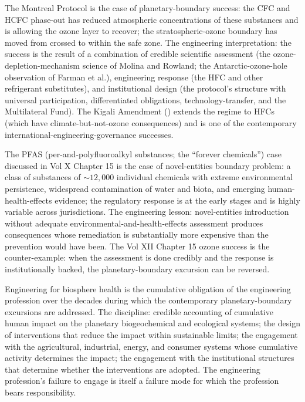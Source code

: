 The Montreal Protocol \cite{law:montreal-protocol-1987} is the case of planetary-boundary success: the CFC and HCFC phase-out has reduced atmospheric concentrations of these substances and is allowing the ozone layer to recover; the stratospheric-ozone boundary has moved from crossed to within the safe zone. The engineering interpretation: the success is the result of a combination of credible scientific assessment (the ozone-depletion-mechanism science of Molina and Rowland; the Antarctic-ozone-hole observation of Farman et al.), engineering response (the HFC and other refrigerant substitutes), and institutional design (the protocol's structure with universal participation, differentiated obligations, technology-transfer, and the Multilateral Fund). The Kigali Amendment (\cite{law:kigali-amendment-2016}) extends the regime to HFCs (which have climate-but-not-ozone consequences) and is one of the contemporary international-engineering-governance successes.

The PFAS (per-and-polyfluoroalkyl substances; the ``forever chemicals'') case discussed in Vol X Chapter 15 is the case of novel-entities boundary problem: a class of substances of $\sim 12{,}000$ individual chemicals with extreme environmental persistence, widespread contamination of water and biota, and emerging human-health-effects evidence; the regulatory response is at the early stages and is highly variable across jurisdictions. The engineering lesson: novel-entities introduction without adequate environmental-and-health-effects assessment produces consequences whose remediation is substantially more expensive than the prevention would have been. The Vol XII Chapter 15 ozone success is the counter-example: when the assessment is done credibly and the response is institutionally backed, the planetary-boundary excursion can be reversed.

\begin{principle}
Engineering for biosphere health is the cumulative obligation of the engineering profession over the decades during which the contemporary planetary-boundary excursions are addressed. The discipline: credible accounting of cumulative human impact on the planetary biogeochemical and ecological systems; the design of interventions that reduce the impact within sustainable limits; the engagement with the agricultural, industrial, energy, and consumer systems whose cumulative activity determines the impact; the engagement with the institutional structures that determine whether the interventions are adopted. The engineering profession's failure to engage is itself a failure mode for which the profession bears responsibility.
\end{principle}

